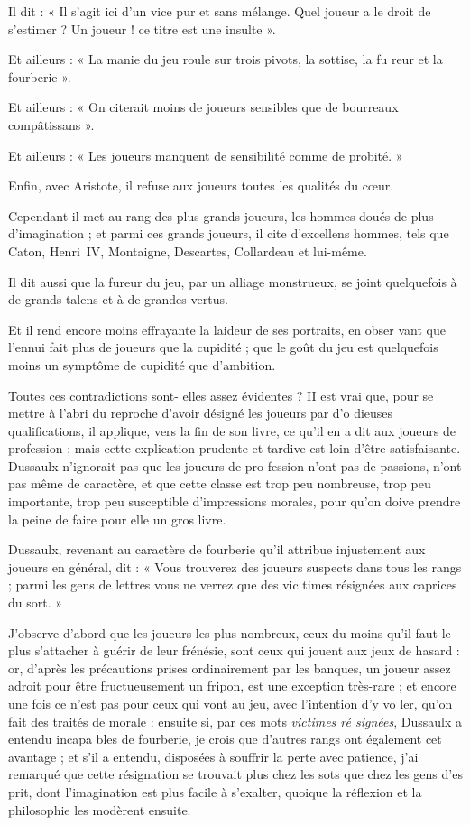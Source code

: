 Il dit : « Il s'agit ici d'un vice pur
et sans mélange. Quel joueur a le
droit de s'estimer ? Un joueur ! ce
titre est une insulte ».

Et ailleurs : « La manie du jeu roule
sur trois pivots, la sottise, la fu%
reur et la fourberie ».

Et ailleurs : « On citerait moins de
joueurs sensibles que de bourreaux
compâtissans ».

Et ailleurs : « Les joueurs manquent
de sensibilité comme de probité. »

Enfin, avec Aristote, il refuse aux
joueurs toutes les qualités du cœur.

Cependant il met au rang des plus
grands joueurs, les hommes doués
de plus d'imagination ; et parmi ces
grands joueurs, il cite d'excellens
hommes, tels que Caton, Henri~IV,
Montaigne, Descartes, Collardeau et
lui-même.

Il dit aussi que la fureur du jeu,
par un alliage monstrueux, se joint
quelquefois à de grands talens et à
de grandes vertus.

Et il rend encore moins effrayante
la laideur de ses portraits, en obser%
vant que l'ennui fait plus de joueurs
que la cupidité ; que le goût du jeu
est quelquefois moins un symptôme
de cupidité que d'ambition.

Toutes ces contradictions sont-%
elles assez évidentes ? II est vrai que,
pour se mettre à l'abri du reproche
d'avoir désigné les joueurs par d'o%
dieuses qualifications, il applique,
vers la fin de son livre, ce qu'il en a
dit aux joueurs de profession ; mais
cette explication prudente et tardive
est loin d'être satisfaisante. Dussaulx
n'ignorait pas que les joueurs de pro%
fession n'ont pas de passions, n'ont
pas même de caractère, et que cette
classe est trop peu nombreuse, trop
peu importante, trop peu susceptible
d'impressions morales, pour qu'on
doive prendre la peine de faire pour
elle un gros livre.

Dussaulx, revenant au caractère de
fourberie qu'il attribue injustement
aux joueurs en général, dit : « Vous
trouverez des joueurs suspects dans
tous les rangs ; parmi les gens de
lettres vous ne verrez que des vic%
times résignées aux caprices du
sort. »

J'observe d'abord que les joueurs
les plus nombreux, ceux du moins
qu'il faut le plus s'attacher à guérir
de leur frénésie, sont ceux qui jouent
aux jeux de hasard : or, d'après les
précautions prises ordinairement par
les banques, un joueur assez adroit
pour être fructueusement un fripon,
est une exception très-rare ; et encore
une fois ce n'est pas pour ceux qui
vont au jeu, avec l'intention d'y vo%
ler, qu'on fait des traités de morale :
ensuite si, par ces mots \emph{victimes ré%
signées}, Dussaulx a entendu incapa%
bles de fourberie, je crois que d'autres
rangs ont également cet avantage ;
et s'il a entendu, disposées à souffrir
la perte avec patience, j'ai remarqué
que cette résignation se trouvait plus
chez les sots que chez les gens d'es%
prit, dont l'imagination est plus facile
à s'exalter, quoique la réflexion et la
philosophie les modèrent ensuite.

